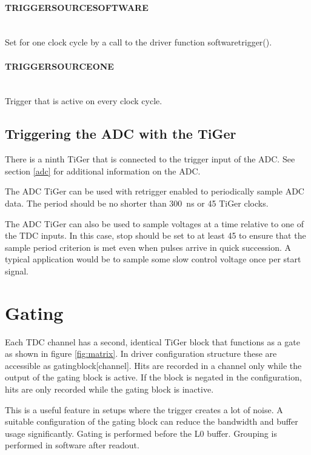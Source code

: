 {	\paragraph*{\textsf{\PREFIX TRIGGER\tu SOURCE\tu SOFTWARE}} \leavevmode \\
		Set for one clock cycle by a call to the driver function
		\textsf{\prefix software\tu trigger()}.
	\paragraph*{\textsf{\PREFIX TRIGGER\tu SOURCE\tu ONE}} \leavevmode \\
		Trigger that is active on every clock cycle.
	


	\subsection{Triggering the ADC with the TiGer}
		\label{adctiger}
		There is a ninth TiGer that is connected to the trigger input of the ADC. See section \ref{adc} for additional information on the ADC. 

		The ADC TiGer can be used with retrigger enabled to periodically sample ADC data. 
		The period should be no shorter than 300~ns or 45 TiGer clocks.

		The ADC TiGer can also be used to sample voltages at a time relative to one of the TDC inputs. In this case, 
		\textsf{stop} should be set to at least 45 to ensure that the sample period criterion is met even when pulses
		arrive in quick succession. A typical application would be to sample some slow control voltage once per start signal.

\newpage
	\section{Gating}
		Each TDC channel has a second, identical TiGer block that functions as a gate as shown in figure \ref{fig:matrix}. In driver configuration structure these are accessible as \textsf{gating\tu block[channel]}.
		Hits are recorded in a channel only while the output of the gating block is active.
		If the block is negated in the configuration, hits are only recorded while the gating block is inactive.
		
		This is a useful feature in setups where the trigger creates a lot of noise.
		A suitable configuration of the gating block can reduce the bandwidth and buffer usage significantly.
		Gating is performed before the L0 buffer. Grouping is performed in software after readout. 
		
}
